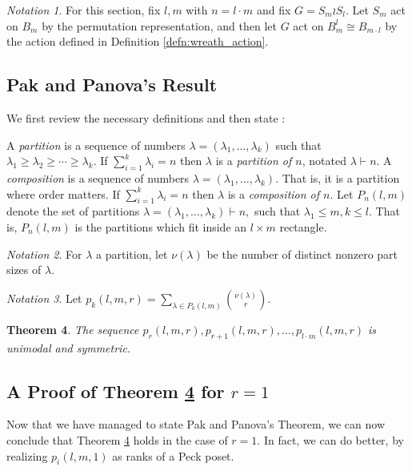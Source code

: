 \documentclass[10 pt]{amsart}
\theoremstyle{plain}
\newtheorem{thm}{Theorem}[section]
\theoremstyle{definition}
\theoremstyle{remark}
\newtheorem{note}[thm]{Notation}
\numberwithin{equation}{section}
\newcommand\ssec{\subsection}
\begin{document}
\begin{note}
For this section, fix $l,m$ with $n = l \cdot m$ and fix $G = S_m \wr S_l.$ Let $S_m$ act on $B_m$ by the permutation representation, and then let $G$ act on $B_{m}^l\cong B_{m \cdot l}$ by the action defined in Definition \ref{defn:wreath_action}.
\end{note}

\ssec{Pak and Panova's Result}
We first review the necessary definitions and then state \cite[Theorem 1.1]{pak}:

A {\it partition} is a sequence of numbers $\lambda = (\lambda_1,\ldots, \lambda_k)$ such that $\lambda_1 \geq \lambda_2 \geq \cdots \geq \lambda_k.$ If $\sum_{i=1}^k \lambda_i = n$ then $\lambda$ is a {\it partition of $n$}, notated $\lambda \vdash n.$ A {\it composition} is a sequence of numbers $\lambda = (\lambda_1,\ldots, \lambda_k).$ That is, it is a partition where order matters. If $\sum_{i=1}^k \lambda_i = n$ then $\lambda$ is a {\it composition of $n$}. Let $P_n(l,m)$ denote the set of partitions $\lambda = (\lambda_1,\ldots, \lambda_k) \vdash n,$ such that $\lambda_1 \leq m,k \leq l.$ That is, $P_n(l,m)$ is the partitions which fit inside an $l \times m$ rectangle.

\begin{note}
\cite[Section 1]{pak} For $\lambda$ a partition, let $\nu(\lambda)$ be the number of distinct nonzero part sizes of $\lambda.$
\end{note}

\begin{note}
\cite[Section 1]{pak}
Let $p_k(l,m,r) = \sum_{\lambda \in P_k(l,m)} \binom{\nu(\lambda)}{r}.$
\end{note}

\begin{thm}
\label{thm:pak_thm}
\cite[Theorem 1.1]{pak}
The sequence $p_r(l,m,r), p_{r+1}(l,m,r),\ldots, p_{l\cdot m}(l,m,r)$ is unimodal and symmetric.
\end{thm}

\ssec{A Proof of Theorem \ref{thm:pak_thm} for $r = 1$}
Now that we have managed to state Pak and Panova's Theorem, we can now conclude that Theorem \ref{thm:pak_thm} holds in the case of $r=1.$ In fact, we can do better, by realizing $p_i(l,m,1)$ as ranks of a Peck poset.
\end{document}
